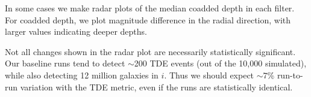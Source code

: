In some cases we make radar plots of the median coadded depth in each filter. For coadded depth, we plot magnitude difference in the radial direction, with larger values indicating deeper depths. 

Not all changes shown in the radar plot are necessarily statistically significant. Our baseline runs tend to detect $\sim$200 TDE events (out of the 10,000 simulated), while also detecting 12 million galaxies in $i$. Thus we should expect $\sim7$\% run-to-run variation with the TDE metric, even if the runs are statistically identical.

